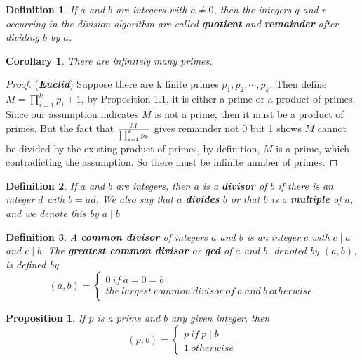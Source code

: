 \documentclass{article}
\newtheorem*{definition}{Definition}
\newtheorem{proposition}[theorem]{Proposition}
\newtheorem{corollary}[theorem]{Corollary}
\begin{document}
    \begin{definition}
        If \(a\) and \(b\) are integers with \(a \neq 0\), then the integers \(q\) and 
        \(r\) occurring in the division algorithm are called \textbf{quotient} and 
        \textbf{remainder} after dividing \(b\) by \(a\).
    \end{definition}
    \begin{corollary}
        There are infinitely many primes.
    \end{corollary}
    \begin{proof}
        (\textbf{\textit{Euclid}})  Suppose there are k finite primes \(p_1, p_2, \cdots, p_k\).
        Then define \(M=\prod_{i=1}^k p_i + 1\), by Proposition 1.1, it is either a 
        prime or a product of primes. Since our assumption indicates \(M\) is not a 
        prime, then it must be a product of primes. But the fact that \(M \over \prod_{i=1}^k p_k\) 
        gives remainder not 0 but 1 shows \(M\) cannot be divided by the existing 
        product of primes, by definition, \(M\) is a prime, which contradicting the 
        assumption. So there must be infinite number of primes.
    \end{proof}
    \begin{definition}
        If \(a\) and \(b\) are integers, then \(a\) is a \textbf{divisor} of \(b\) if 
        there is an integer \(d\) with \(b=ad\). We also say that \(a\) \textbf{divides} 
        \(b\) or that \(b\) is a \textbf{multiple} of \(a\), and we denote this by \(a \mid b\)
    \end{definition}
    \begin{definition}
        A \textbf{common divisor} of integers \(a\) and \(b\) is an integer \(c\) with 
        \(c \mid a\) and \(c \mid b\). The \textbf{greatest common divisor} or \textbf{gcd} 
        of \(a\) and \(b\), denoted by \((a, b)\), is defined by 
        \begin{equation*}
            (a, b) = \begin{cases}
                0 \ if \  a=0=b\\
                the\ largest\ common\ divisor\ of\ a\ and\ b\ otherwise
            \end{cases}
        \end{equation*}
    \end{definition}
    \begin{proposition}
        If \(p\) is a prime and \(b\) any given integer, then 
        \[
            (p, b)=\begin{cases}
                p\ if\ p \mid b\\
                1\ otherwise
            \end{cases}  
        \]
    \end{proposition}
\end{document}
